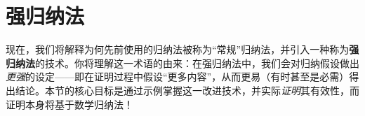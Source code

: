 \section{强归纳法}

现在，我们将解释为何先前使用的归纳法被称为``常规''归纳法，并引入一种称为\textbf{强归纳法}的技术。你将理解这一术语的由来：在强归纳法中，我们会对归纳假设做出\emph{更强}的设定——即在证明过程中假设``更多内容''，从而更易（有时甚至是必需）得出结论。本节的核心目标是通过示例掌握这一改进技术，并实际\emph{证明}其有效性，而证明本身将基于数学归纳法！











